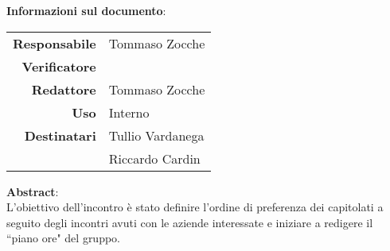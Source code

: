 \begin{center}
\textbf{Informazioni sul documento}: \\
\vspace{0.5cm}

\begin{tabular}{r|l}
    \textbf{Responsabile} & Tommaso Zocche \\ 
    \textbf{Verificatore} &  \\ 
    \textbf{Redattore} & Tommaso Zocche \\ 
    \textbf{Uso} & Interno \\ 
    \textbf{Destinatari} & Tullio Vardanega \\ & Riccardo Cardin \\ 
\end{tabular}

\vfill

\textbf{Abstract}: \\
\vspace{0.5cm}
L'obiettivo dell'incontro è stato definire l'ordine di preferenza dei capitolati a seguito degli incontri avuti con le aziende interessate e iniziare a redigere il ``piano ore" del gruppo.
\end{center}


\bigskip